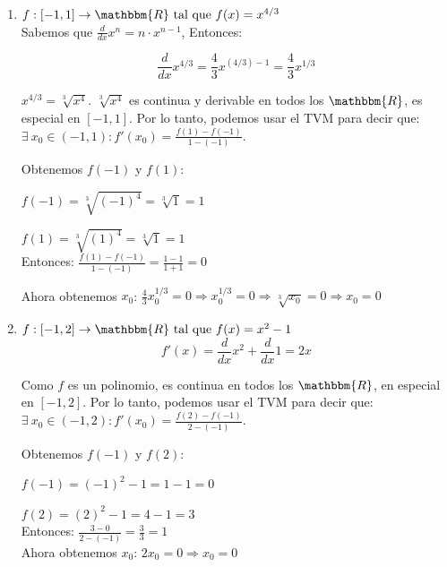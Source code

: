 \documentclass[12pt]{article}
\begin{document}
\begin{enumerate}[\hspace{9px} a)]
    \item \(f: [-1,1] \rightarrow \mathbbm{R} \ \text{tal que} \ f(x)=x^{4/3}\)\\

        Sabemos que \(\frac{d}{dx}x^n=n\cdot x^{n-1}\), Entonces:

        \[\displaystyle\frac{d}{dx}x^{4/3}=\frac{4}{3}x^{(4/3)-1}=\frac{4}{3}x^{1/3}\]

        \(x^{4/3}=\sqrt[3]{x^4}\). \quad $\sqrt[3]{x^4}$ es continua y derivable en todos los $\mathbbm{R}$, es especial en $[-1,1]$. Por lo tanto, podemos usar el TVM para decir que: \(\exists \ x_0 \in (-1,1) : f'(x_0)=\displaystyle\frac{f(1)-f(-1)}{1-(-1)}\).

        Obtenemos $f(-1)$ y $f(1)$:

        \(f(-1)=\sqrt[3]{(-1)^4}=\sqrt[3]{1}=1\)

        \(f(1)=\sqrt[3]{(1)^4}=\sqrt[3]{1}=1\)\\

        Entonces: \quad \(\displaystyle\frac{f(1)-f(-1)}{1-(-1)}=\frac{1-1}{1+1}=0\)

        Ahora obtenemos $x_0$: \quad \(\displaystyle\frac{4}{3}x_0^{1/3}=0 \Longrightarrow x_0^{1/3}=0 \Rightarrow \sqrt[3]{x_0}=0 \Rightarrow x_0=0\)\\

    \item \(f: [-1,2] \rightarrow \mathbbm{R} \ \text{tal que} \ f(x)=x^2-1\)\\

        \[f'(x)=\displaystyle\frac{d}{dx}x^2+\frac{d}{dx}1=2x\]

        Como $f$ es un polinomio, es continua en todos los $\mathbbm{R}$, en especial en $[-1,2]$. Por lo tanto, podemos usar el TVM para decir que: \(\exists \ x_0 \in (-1,2) : f'(x_0)=\displaystyle\frac{f(2)-f(-1)}{2-(-1)}\).

        Obtenemos $f(-1)$ y $f(2)$:

        \(f(-1)=(-1)^2-1=1-1=0\)

        \(f(2)=(2)^2-1=4-1=3\)\\

        Entonces: \quad \(\displaystyle\frac{3-0}{2-(-1)}=\frac{3}{3}=1\)\\

        Ahora obtenemos $x_0$: \quad \(2x_0=0 \Rightarrow x_0=0\)\\


\end{enumerate}
\end{document}
